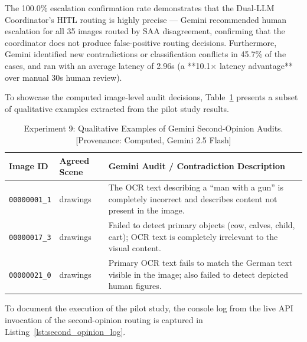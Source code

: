 \documentclass[12pt,onecolumn,a4paper]{IEEEtran}
\begin{document}
The 100.0\% escalation confirmation rate demonstrates that the Dual-LLM Coordinator's HITL routing is highly precise --- Gemini recommended human escalation for all 35 images routed by SAA disagreement, confirming that the coordinator does not produce false-positive routing decisions. Furthermore, Gemini identified new contradictions or classification conflicts in 45.7\% of the cases, and ran with an average latency of 2.96s (a **10.1$\times$ latency advantage** over manual 30s human review).

To showcase the computed image-level audit decisions, Table~\ref{tab:second_opinion_examples} presents a subset of qualitative examples extracted from the pilot study results.

\begin{table}[!htbp]
\centering
\caption{Experiment 9: Qualitative Examples of Gemini Second-Opinion Audits. [Provenance: Computed, Gemini 2.5 Flash]}
\label{tab:second_opinion_examples}
\begin{tabular}{lp{2.5cm}p{7.5cm}}
\toprule
\textbf{Image ID} & \textbf{Agreed Scene} & \textbf{Gemini Audit / Contradiction Description} \\
\midrule
\texttt{00000001\_1} & drawings & The OCR text describing a ``man with a gun'' is completely incorrect and describes content not present in the image. \\
\midrule
\texttt{00000017\_3} & drawings & Failed to detect primary objects (cow, calves, child, cart); OCR text is completely irrelevant to the visual content. \\
\midrule
\texttt{00000021\_0} & drawings & Primary OCR text fails to match the German text visible in the image; also failed to detect depicted human figures. \\
\bottomrule
\end{tabular}
\end{table}

To document the execution of the pilot study, the console log from the live API invocation of the second-opinion routing is captured in Listing~\ref{lst:second_opinion_log}.
\end{document}
